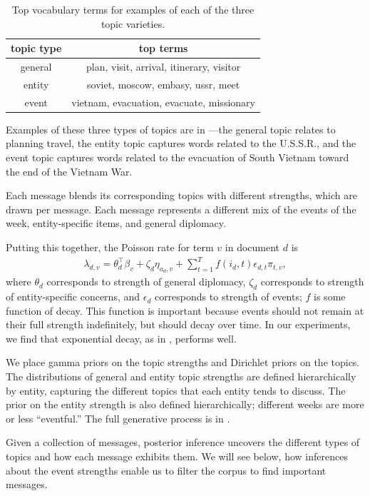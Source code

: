 \begin{table}
\centering
\small
\begin{tabular}{cc}
\toprule
topic type & top terms \\
\midrule
general & plan, visit, arrival, itinerary, visitor\\
entity & soviet, moscow, embasy, ussr, meet \\
event & vietnam, evacuation, evacuate, missionary \\
\bottomrule
\end{tabular}
\label{tab:3topics}
\caption{Top vocabulary terms for examples of each of the three topic varieties.}
\end{table}

Examples of these three types of topics are in ---the general topic 
relates to planning travel, the entity topic captures words related to the U.S.S.R., and 
the event topic captures words related to the evacuation of South Vietnam toward the end of the Vietnam War.

Each message blends its corresponding topics with different
strengths, which are drawn per message. Each message represents a
different mix of the events of the week, entity-specific items, and
general diplomacy.

Putting this together, the Poisson rate for term $v$ in document $d$ is
\begin{align}
  \lambda_{d,v} = \theta_d^\top\beta_v  + \zeta_d \eta_{a_d,v} + \sum_{t=1}^T f(i_d, t) \epsilon_{d,t} \pi_{t,v},
\end{align} where $\theta_d$ corresponds to strength of general diplomacy, $\zeta_d$ corresponds to strength of entity-specific concerns, and $\epsilon_d$ corresponds to strength of events; $f$ is some function of decay.  This function is important because events should not remain at their full strength indefinitely, but should decay over time.  In our experiments, we find that exponential decay, as in , performs well.

We place gamma priors on the topic strengths and Dirichlet priors on
the topics. The distributions of general and entity topic strengths are defined
hierarchically by entity, capturing the different topics that each
entity tends to discuss.  The prior on the entity strength is
also defined hierarchically; different weeks are more or less
``eventful.'' The full generative process is in .

Given a collection of messages, posterior inference uncovers the
different types of topics and how each message exhibits them. We will
see below, how inferences about the event strengths enable us to
filter the corpus to find important messages.

